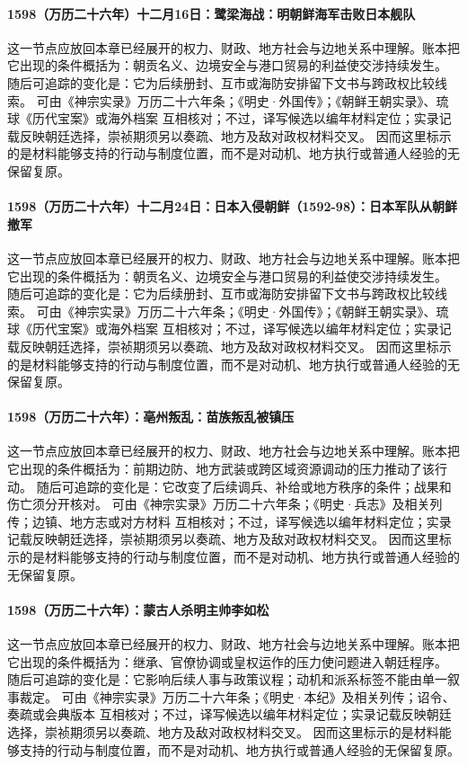 \paragraph{1598（万历二十六年）十二月16日：鹭梁海战：明朝鲜海军击败日本舰队} 这一节点应放回本章已经展开的权力、财政、地方社会与边地关系中理解。账本把它出现的条件概括为：朝贡名义、边境安全与港口贸易的利益使交涉持续发生。 随后可追踪的变化是：它为后续册封、互市或海防安排留下文书与跨政权比较线索。 可由《神宗实录》万历二十六年条；《明史·外国传》；《朝鲜王朝实录》、琉球《历代宝案》或海外档案 互相核对；不过，译写候选以编年材料定位；实录记载反映朝廷选择，崇祯期须另以奏疏、地方及敌对政权材料交叉。 因而这里标示的是材料能够支持的行动与制度位置，而不是对动机、地方执行或普通人经验的无保留复原。

\paragraph{1598（万历二十六年）十二月24日：日本入侵朝鲜（1592-98）：日本军队从朝鲜撤军} 这一节点应放回本章已经展开的权力、财政、地方社会与边地关系中理解。账本把它出现的条件概括为：朝贡名义、边境安全与港口贸易的利益使交涉持续发生。 随后可追踪的变化是：它为后续册封、互市或海防安排留下文书与跨政权比较线索。 可由《神宗实录》万历二十六年条；《明史·外国传》；《朝鲜王朝实录》、琉球《历代宝案》或海外档案 互相核对；不过，译写候选以编年材料定位；实录记载反映朝廷选择，崇祯期须另以奏疏、地方及敌对政权材料交叉。 因而这里标示的是材料能够支持的行动与制度位置，而不是对动机、地方执行或普通人经验的无保留复原。

\paragraph{1598（万历二十六年）：亳州叛乱：苗族叛乱被镇压} 这一节点应放回本章已经展开的权力、财政、地方社会与边地关系中理解。账本把它出现的条件概括为：前期边防、地方武装或跨区域资源调动的压力推动了该行动。 随后可追踪的变化是：它改变了后续调兵、补给或地方秩序的条件；战果和伤亡须分开核对。 可由《神宗实录》万历二十六年条；《明史·兵志》及相关列传；边镇、地方志或对方材料 互相核对；不过，译写候选以编年材料定位；实录记载反映朝廷选择，崇祯期须另以奏疏、地方及敌对政权材料交叉。 因而这里标示的是材料能够支持的行动与制度位置，而不是对动机、地方执行或普通人经验的无保留复原。

\paragraph{1598（万历二十六年）：蒙古人杀明主帅李如松} 这一节点应放回本章已经展开的权力、财政、地方社会与边地关系中理解。账本把它出现的条件概括为：继承、官僚协调或皇权运作的压力使问题进入朝廷程序。 随后可追踪的变化是：它影响后续人事与政策议程；动机和派系标签不能由单一叙事裁定。 可由《神宗实录》万历二十六年条；《明史·本纪》及相关列传；诏令、奏疏或会典版本 互相核对；不过，译写候选以编年材料定位；实录记载反映朝廷选择，崇祯期须另以奏疏、地方及敌对政权材料交叉。 因而这里标示的是材料能够支持的行动与制度位置，而不是对动机、地方执行或普通人经验的无保留复原。

